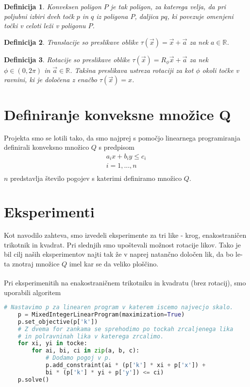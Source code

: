 \documentclass[a4paper, 12pt]{article}
\newtheorem{definicija}{Definicija}
\begin{document}
\begin{definicija}
    Konveksen poligon $P$ je tak poligon, za katerega velja, da pri poljubni izbiri dveh točk $p$ in $q$
     iz poligona $P$, daljica $pq$, ki povezuje omenjeni točki v celoti leži v poligonu $P$.
\end{definicija}

\begin{definicija}
    Translacije so preslikave oblike $\tau(\vec{x}) = \vec{x} + \vec{a}$ za nek $a \in \mathbb{R}$.
\end{definicija}

\begin{definicija}
    Rotacije so preslikave oblike $\tau (\vec{x}) = R_{\phi}\vec{x} + \vec{a}$ za nek $\phi \in (0, 2\pi)$ in $\vec{a} \in \mathbb{R}$. 
    Takšna preslikava ustreza rotaciji za kot $\phi$ okoli točke v ravnini, ki je določena z enačbo $\tau (\vec{x}) = x$. 
\end{definicija}


\section{Definiranje konveksne množice Q}
Projekta smo se lotili tako, da smo najprej s pomočjo linearnega programiranja definirali konveksno množico $Q$ s predpisom
\begin{align*}
    a_i x + b_i y \le c_i \\
    i = 1, ..., n \\
\end{align*}
$n$ predstavlja število pogojev s katerimi definiramo množico $Q$.
\newpage
\section{Eksperimenti}
Kot navodilo zahteva, smo izvedeli eksperimente za tri like - krog, enakostraničen trikotnik in kvadrat. Pri slednjih smo upoštevali možnost rotacije likov.
\newline
Tako je bil cilj naših eksperimentov najti tak že v naprej natančno določen lik, da bo le-ta znotraj množice $Q$ imel kar se da veliko ploščino.
\\~\\
Pri eksperimenitih na enakostraničnem trikotniku in kvadratu (brez rotacij), smo uporabili algoritem 
\begin{lstlisting}[language=Python]
    # Nastavimo p za linearen program v katerem iscemo najvecjo skalo.
    p = MixedIntegerLinearProgram(maximization=True)
    p.set_objective(p['k'])
    # Z dvema for zankama se sprehodimo po tockah zrcaljenega lika
    # in polravninah lika v katerega zrcalimo.
    for xi, yi in tocke:
        for ai, bi, ci in zip(a, b, c):
            # Dodamo pogoj v p.
            p.add_constraint(ai * (p['k'] * xi + p['x']) + 
            bi * (p['k'] * yi + p['y']) <= ci)
    p.solve()
\end{lstlisting}
\end{document}
